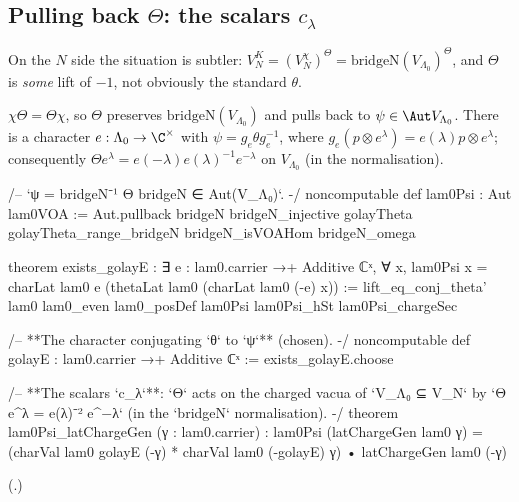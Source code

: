 \subsection{Pulling back \texorpdfstring{$\Theta$}{Theta}: the scalars \texorpdfstring{$c_\lambda$}{c\_lambda}}

On the $N$ side the situation is subtler: $V_N^K=(V_N^\chi)^\Theta=\mathrm{bridgeN}(V_{\Lambda_0})^\Theta$,
and $\Theta$ is \emph{some} lift of $-1$, not obviously the standard $\theta$.

\begin{theorem}\label{ch11:thm:psi}
$\chi\Theta=\Theta\chi$, so $\Theta$ preserves $\mathrm{bridgeN}(V_{\Lambda_0})$ and pulls back to
$\psi\in\Aut V_{\Lambda_0}$.  There is a character $e:\Lambda_0\to\C^\times$ with
$\psi=g_e\theta g_e^{-1}$, where $g_e(p\otimes e^\lambda)=e(\lambda)p\otimes e^\lambda$; consequently
$\Theta e^\lambda=e(-\lambda)e(\lambda)^{-1}e^{-\lambda}$ on $V_{\Lambda_0}$ (in the 
normalisation).
\end{theorem}
\begin{leancode}
/-- `ψ = bridgeN⁻¹ Θ bridgeN ∈ Aut(V_{Λ₀})`. -/
noncomputable def lam0Psi : Aut lam0VOA :=
  Aut.pullback bridgeN bridgeN_injective golayTheta golayTheta_range_bridgeN bridgeN_isVOAHom
    bridgeN_omega

theorem exists_golayE :
    ∃ e : lam0.carrier →+ Additive ℂˣ,
      ∀ x, lam0Psi x = charLat lam0 e (thetaLat lam0 (charLat lam0 (-e) x)) :=
  lift_eq_conj_theta' lam0 lam0_even lam0_posDef lam0Psi lam0Psi_hSt lam0Psi_chargeSec

/-- **The character conjugating `θ` to `ψ`** (chosen). -/
noncomputable def golayE : lam0.carrier →+ Additive ℂˣ := exists_golayE.choose

/-- **The scalars `c_λ`**: `Θ` acts on the charged vacua of `V_{Λ₀} ⊆ V_N` by
`Θ e^λ = e(λ)⁻² e^{−λ}` (in the `bridgeN` normalisation). -/
theorem lam0Psi_latChargeGen (γ : lam0.carrier) :
    lam0Psi (latChargeGen lam0 γ)
      = (charVal lam0 golayE (-γ) * charVal lam0 (-golayE) γ) • latChargeGen lam0 (-γ)
\end{leancode}
(.)
